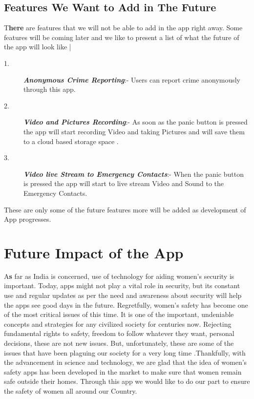 \documentclass[	DIV=calc,%
							paper=a4,%
							fontsize=12pt,%
							twocolumn]{scrartcl}
\newcommand{\initial}[1]{%
     \lettrine[lines=3,lhang=0.3,nindent=0em]{
     				\color{DarkGoldenrod}
     				{\textsf{#1}}}{}}
\begin{document}
\subsection*{Features We Want to Add in The Future}
\initial{T}\textbf{here} are features that we will not be able to add in the app right away. Some features will be coming later and we like to present a list of what the future of the app will look like
|\begin{description}
    \item[1.]\textbf{\textit{Anonymous Crime Reporting}}:- Users can report crime anonymously through this app.
    \item[2.]\textbf{\textit{Video and Pictures Recording}}:- As soon as the panic button is pressed the app will start recording Video and taking Pictures and will save them to a cloud based storage space .
    \item[3.]\textbf{\textit{Video live Stream to Emergency Contacts}}:- When the panic button is pressed the app will start to live stream Video and Sound to the Emergency Contacts. 
\end{description}
These are only some of the future features more will be added as development of App progresses.

\section*{Future Impact of the App}
\initial{A}\textbf{s} far as India is concerned, use of technology for aiding women’s security is important. Today, apps might not play a vital role in security, but its constant use and regular updates as per the need and awareness about security will help the apps see good days in the future.
\newline
\newline
Regretfully, women’s safety has become one of the most critical issues of this time. It is one of the important, undeniable concepts and strategies for any civilized society for centuries now. Rejecting fundamental rights to safety, freedom to follow whatever they want, personal decisions, these are not new issues. But, unfortunately, these are some of the issues that have been plaguing our society for a very long time .Thankfully, with the advancement in science and technology, we are glad that the idea of women’s safety apps has been developed in the market to make sure that women remain safe outside their homes.
\newline
\newline
Through this app we would like to do our part to ensure the safety of women all around our Country. 
\newpage
\end{document}
